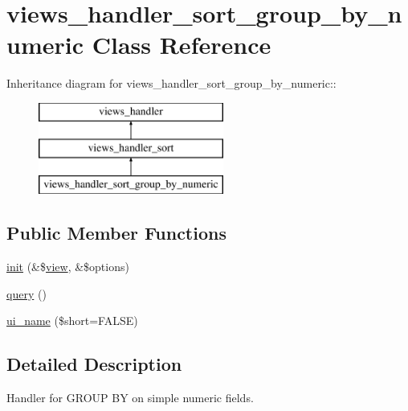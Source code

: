 \hypertarget{classviews__handler__sort__group__by__numeric}{
\section{views\_\-handler\_\-sort\_\-group\_\-by\_\-numeric Class Reference}
\label{classviews__handler__sort__group__by__numeric}
}
Inheritance diagram for views\_\-handler\_\-sort\_\-group\_\-by\_\-numeric::\begin{figure}[H]
\begin{center}
\leavevmode
\includegraphics[height=3cm]{classviews__handler__sort__group__by__numeric}
\end{center}
\end{figure}
\subsection*{Public Member Functions}
\begin{DoxyCompactItemize}
\item 
\hyperlink{classviews__handler__sort__group__by__numeric_a940de6f2bd43bf9987988c425ef48a7e}{init} (\&\$\hyperlink{classview}{view}, \&\$options)
\item 
\hyperlink{classviews__handler__sort__group__by__numeric_ada5ef20a050242560d9da35ef2202d87}{query} ()
\item 
\hyperlink{classviews__handler__sort__group__by__numeric_a06f1b398512f9302298848b2122fa834}{ui\_\-name} (\$short=FALSE)
\end{DoxyCompactItemize}


\subsection{Detailed Description}
Handler for GROUP BY on simple numeric fields. 

